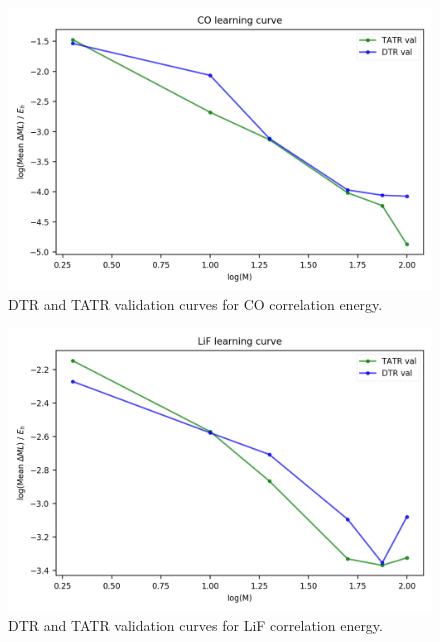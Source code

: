 \begin{figure}
    \centering
    \includegraphics[scale=1.0]{p2/figures/si/CO_learn_log_e.png}
    \caption{DTR and TATR validation curves for CO correlation energy.}
\end{figure}

\begin{figure}
    \centering
    \includegraphics[scale=1.0]{p2/figures/si/LiF_learn_log_e.png}
    \caption{DTR and TATR validation curves for LiF correlation energy.}
\end{figure}

